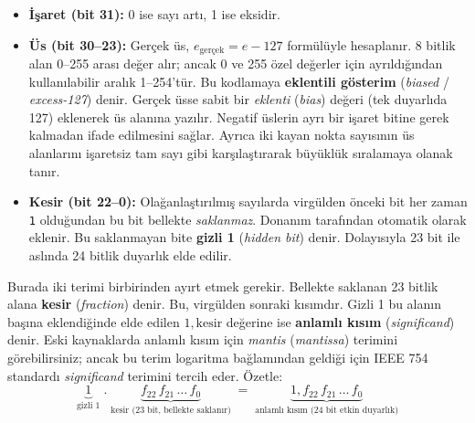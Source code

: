 \begin{itemize}
  \item \textbf{İşaret (bit 31):} 0 ise sayı artı, 1 ise eksidir.

  \item \textbf{Üs (bit 30--23):} Gerçek üs, $e_{\text{gerçek}} = e - 127$ formülüyle hesaplanır. 8 bitlik alan 0--255 arası değer alır; ancak 0 ve 255 özel değerler için ayrıldığından kullanılabilir aralık 1--254'tür. Bu kodlamaya \textbf{eklentili gösterim} (\emph{biased} / \emph{excess-127}) denir. Gerçek üsse sabit bir \emph{eklenti} (\emph{bias}) değeri (tek duyarlıda 127) eklenerek üs alanına yazılır. Negatif üslerin ayrı bir işaret bitine gerek kalmadan ifade edilmesini sağlar. Ayrıca iki kayan nokta sayısının üs alanlarını işaretsiz tam sayı gibi karşılaştırarak büyüklük sıralamaya olanak tanır.

  \item \textbf{Kesir (bit 22--0):} Olağanlaştırılmış sayılarda virgülden önceki bit her zaman \texttt{1} olduğundan bu bit bellekte \emph{saklanmaz}. Donanım tarafından otomatik olarak eklenir. Bu saklanmayan bite \textbf{gizli 1} (\emph{hidden bit}) denir. Dolayısıyla 23 bit ile aslında 24 bitlik duyarlık elde edilir.
\end{itemize}

Burada iki terimi birbirinden ayırt etmek gerekir. Bellekte saklanan 23 bitlik alana \textbf{kesir} (\emph{fraction}) denir. Bu, virgülden sonraki kısımdır. Gizli 1 bu alanın başına eklendiğinde elde edilen $1{,}\text{kesir}$ değerine ise \textbf{anlamlı kısım} (\emph{significand}) denir. Eski kaynaklarda anlamlı kısım için \emph{mantis} (\emph{mantissa}) terimini görebilirsiniz; ancak bu terim logaritma bağlamından geldiği için IEEE 754 standardı \emph{significand} terimini tercih eder. Özetle:
\[
\underbrace{1}_{\text{gizli 1}}\;.\;\underbrace{f_{22}\,f_{21}\,\ldots\,f_0}_{\text{kesir (23 bit, bellekte saklanır)}} \;=\; \underbrace{1{,}f_{22}\,f_{21}\,\ldots\,f_0}_{\text{anlamlı kısım (24 bit etkin duyarlık)}}
\]

